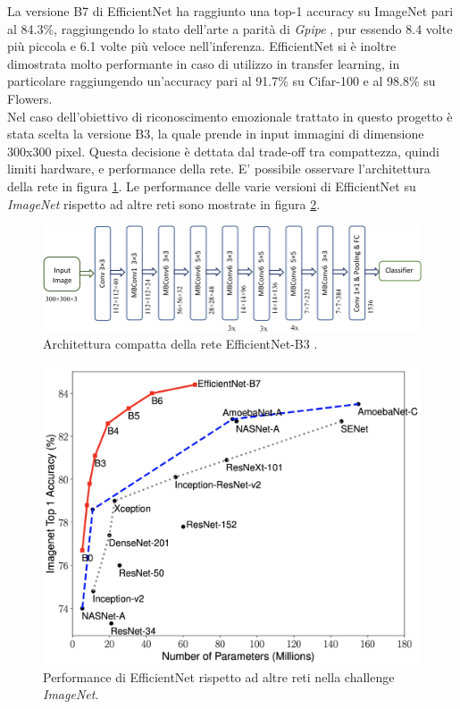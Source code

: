 \documentclass[11pt]{report}
\begin{document}
        La versione B7 di EfficientNet ha raggiunto una top-1 accuracy su ImageNet pari al 84.3\%, raggiungendo lo stato dell'arte a parità di \textit{Gpipe} \cite{huang2019gpipe}, pur essendo 8.4 volte più piccola e 6.1 volte più veloce nell'inferenza.
        EfficientNet si è inoltre dimostrata molto performante in caso di utilizzo in transfer learning, in particolare raggiungendo un'accuracy pari al 91.7\% su Cifar-100 e al 98.8\% su Flowers.\\
        
        Nel caso dell'obiettivo di riconoscimento emozionale trattato in questo progetto è stata scelta la versione B3, la quale prende in input immagini di dimensione 300x300 pixel. Questa decisione è dettata dal trade-off tra compattezza, quindi limiti hardware, e performance della rete. E' possibile osservare l'architettura della rete in figura \ref{fig:efficientnet-arch}.
        Le performance delle varie versioni di EfficientNet su \textit{ImageNet} rispetto ad altre reti sono mostrate in figura \ref{fig:efficientnet}.

\begin{figure}[h]
    \centering
    \includegraphics[scale=2]{img/Schematic-representation-of-EfficientNet-B3.png}
    \caption{Architettura compatta della rete EfficientNet-B3 \cite{effnetb3-arch}.}
    \label{fig:efficientnet-arch}
\end{figure}

\newpage


\begin{figure}
    \centering
    \includegraphics[scale=0.2]{img/efficientnet-performance.png}
    \caption{Performance di EfficientNet rispetto ad altre reti nella challenge \textit{ImageNet}.}
    \label{fig:efficientnet}
\end{figure}
\end{document}
